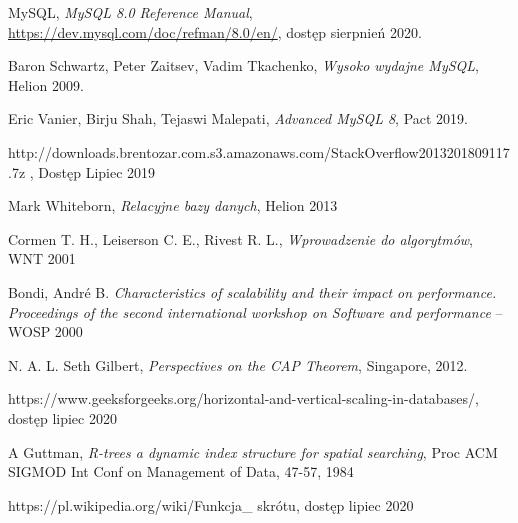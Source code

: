 \begin{thebibliography}{}
	
	 MySQL, \emph{MySQL 8.0 Reference Manual}, \url{https://dev.mysql.com/doc/refman/8.0/en/}, dostęp sierpnień 2020.
	
	 Baron Schwartz, Peter Zaitsev, Vadim Tkachenko,  \emph{Wysoko wydajne MySQL}, Helion 2009.
	
	 Eric Vanier, Birju Shah, Tejaswi Malepati,  \emph{Advanced MySQL 8}, Pact 2019.
	
	 http://downloads.brentozar.com.s3.amazonaws.com/\newline StackOverflow2013\textunderscore 201809117.7z , Dostęp Lipiec 2019
	
	 Mark Whiteborn, \emph{Relacyjne bazy danych}, Helion 2013
	
	 Cormen T. H., Leiserson C. E., Rivest R. L., \emph{ Wprowadzenie do algorytmów},  WNT 2001	
	
	 Bondi, André B. \emph{ Characteristics of scalability and their impact on performance. Proceedings of the second international workshop on Software and performance} – WOSP 2000
	
	 N. A. L. Seth Gilbert, \emph{Perspectives on the CAP
		Theorem}, Singapore, 2012.
	
	 https://www.geeksforgeeks.org/horizontal-and-vertical-scaling-in-databases/, dostęp lipiec 2020
	
	 A Guttman, \emph{R-trees a dynamic index structure for spatial searching}, Proc ACM SIGMOD Int Conf on Management of Data, 47-57, 1984 
	
	 https://pl.wikipedia.org/wiki/Funkcja\_ skrótu, dostęp lipiec 2020
	
\end{thebibliography}